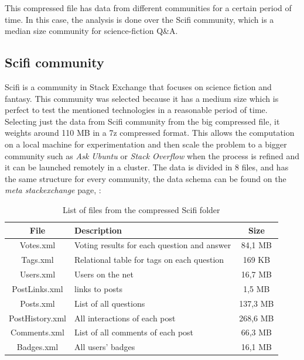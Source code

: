 \documentclass[11pt]{book} %
\begin{document}
    This compressed file has data from different communities for a certain period of time. In this case, the analysis is done over the Scifi community, which is a median size community for science-fiction Q\&A.

    \subsection{Scifi community}

    Scifi is a community in Stack Exchange that focuses on science fiction and fantasy. This community was selected because it has a medium size which is perfect to test the mentioned technologies in a reasonable period of time. Selecting just the data from Scifi community from the big compressed file, it weights around 110 MB in a 7z compressed format. This allows the computation on a local machine for experimentation and then scale the problem to a bigger community such as \emph{Ask Ubuntu} or \emph{Stack Overflow} when the process is refined and it can be launched remotely in a cluster. The data is divided in 8 files, and has the same structure for every community, the data schema can be found on the \emph{meta stackexchange} page, \cite{meta-stackexchange-data-structure}:

    \begin{table}[!ht]
      \centering
      \begin{tabular}{|c|p{}|c|}
        \hline

        File & Description & Size \\ \hline
        Votes.xml & Voting results for each question and answer & 84,1 MB \\ \hline
        Tags.xml & Relational table for tags on each question & 169 KB \\ \hline
        Users.xml & Users on the net & 16,7 MB \\ \hline
        PostLinks.xml & links to posts & 1,5 MB \\ \hline
        Posts.xml & List of all questions & 137,3 MB \\ \hline
        PostHistory.xml & All interactions of each post & 268,6 MB \\ \hline
        Comments.xml & List of all comments of each post & 66,3 MB \\ \hline
        Badges.xml & All users' badges & 16,1 MB \\

        \hline
      \end{tabular}
      \caption{List of files from the compressed Scifi folder}
      \label{tab:list_of_files}
    \end{table}
\end{document}

